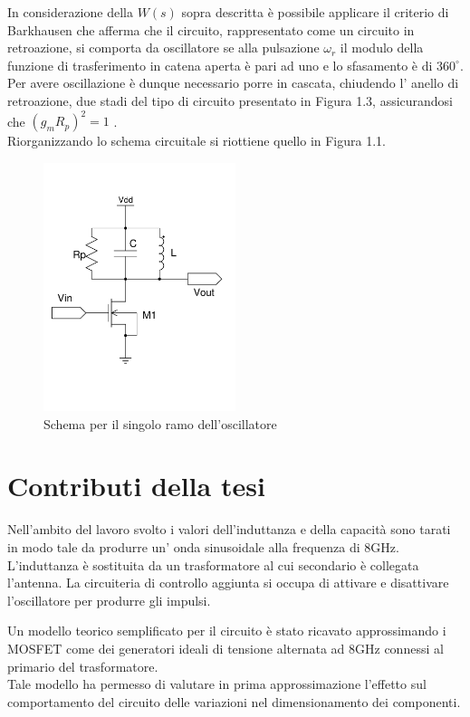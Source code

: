 \documentclass[a4paper, 12pt]{memoir}
\begin{document}
In considerazione della $ W(s) $ sopra descritta è possibile applicare il
criterio di Barkhausen\cite{JaegerMicro} che afferma che il circuito,
rappresentato come un circuito in retroazione, si comporta da oscillatore se
alla pulsazione $ \omega _r $ il modulo della funzione di trasferimento in
catena aperta è pari ad uno e lo sfasamento è di $ 360^{\circ} $.\\
Per avere oscillazione è dunque necessario porre in cascata, chiudendo l'
anello di retroazione, due stadi del tipo di circuito presentato in Figura 1.3,
assicurandosi che $ {\left( g_m R_p \right)}^2 = 1 $ 
\cite[p.652]{RazaviFundamentals}.\\
Riorganizzando lo schema circuitale si riottiene quello in Figura 1.1.

\begin{figure}[h]
\centering
\includegraphics[width=0.5\textwidth]{images/LCsingle.pdf}
\caption{Schema per il singolo ramo dell'oscillatore}
\end{figure}

\section{Contributi della tesi}
Nell'ambito del lavoro svolto i valori dell'induttanza e della capacità sono
tarati in modo tale da produrre un' onda sinusoidale alla frequenza di 8GHz.\\
L'induttanza è sostituita da un trasformatore al cui secondario è collegata
l'antenna. La circuiteria di controllo aggiunta si occupa di attivare e
disattivare l'oscillatore per produrre gli impulsi.

Un modello teorico semplificato per il circuito è stato ricavato approssimando
i MOSFET come dei generatori ideali di tensione alternata ad 8GHz
connessi al primario del trasformatore. \\
Tale modello ha permesso di valutare in prima approssimazione l'effetto sul
comportamento del circuito delle variazioni nel dimensionamento dei componenti.
\end{document}
